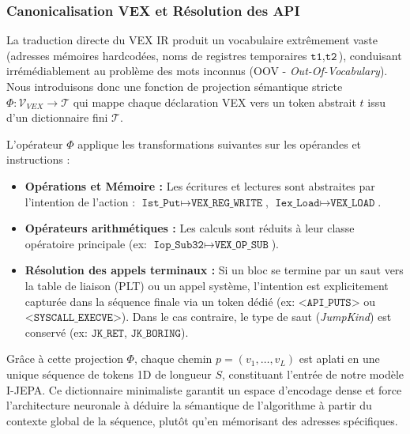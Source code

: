 \subsubsection{Canonicalisation VEX et Résolution des API}
La traduction directe du VEX IR produit un vocabulaire extrêmement vaste (adresses mémoires hardcodées, noms de registres temporaires $\texttt{t1}, \texttt{t2}$), conduisant irrémédiablement au problème des mots inconnus (OOV - \textit{Out-Of-Vocabulary}). Nous introduisons donc une fonction de projection sémantique stricte $\Phi : \mathcal{V}_{VEX} \rightarrow \mathcal{T}$ qui mappe chaque déclaration VEX vers un token abstrait $t$ issu d'un dictionnaire fini $\mathcal{T}$.

L'opérateur $\Phi$ applique les transformations suivantes sur les opérandes et instructions :
\begin{itemize}
    \item \textbf{Opérations et Mémoire :} Les écritures et lectures sont abstraites par l'intention de l'action : $\texttt{Ist\_Put} \mapsto \texttt{VEX\_REG\_WRITE}$, $\texttt{Iex\_Load} \mapsto \texttt{VEX\_LOAD}$.
    \item \textbf{Opérateurs arithmétiques :} Les calculs sont réduits à leur classe opératoire principale (ex: $\texttt{Iop\_Sub32} \mapsto \texttt{VEX\_OP\_SUB}$).
    \item \textbf{Résolution des appels terminaux :} Si un bloc se termine par un saut vers la table de liaison (PLT) ou un appel système, l'intention est explicitement capturée dans la séquence finale via un token dédié (ex: $\texttt{<API\_PUTS>}$ ou $\texttt{<SYSCALL\_EXECVE>}$). Dans le cas contraire, le type de saut (\textit{JumpKind}) est conservé (ex: $\texttt{JK\_RET}$, $\texttt{JK\_BORING}$).
\end{itemize}

Grâce à cette projection $\Phi$, chaque chemin $p = (v_1, \dots, v_L)$ est aplati en une unique séquence de tokens 1D de longueur $S$, constituant l'entrée de notre modèle I-JEPA. Ce dictionnaire minimaliste garantit un espace d'encodage dense et force l'architecture neuronale à déduire la sémantique de l'algorithme à partir du contexte global de la séquence, plutôt qu'en mémorisant des adresses spécifiques.

